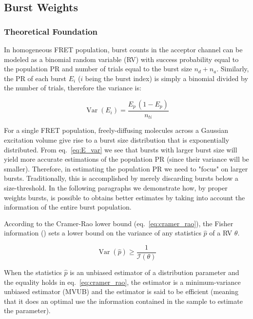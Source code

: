 \subsection{Burst Weights}
\label{sec:burstweights_theory}
\subsubsection{Theoretical Foundation}
In homogeneous FRET population, burst counts in the acceptor channel can be
modeled as a binomial random variable (RV) with success probability equal to the
population PR and number of trials equal to the burst size $n_d + n_a$.
Similarly, the PR of each burst $E_i$ ($i$ being the burst index) is 
simply a binomial divided by the number of trials, therefore the variance is:

\begin{equation}
\label{eq:E_var}
\operatorname{Var} (E_i) = \frac{E_p\,(1 - E_p)}{n_{ti}}
\end{equation}

For a single FRET population, freely-diffusing molecules across 
a Gaussian excitation volume give rise to 
a burst size distribution that is exponentially distributed.
From eq.~\ref{eq:E_var} we see that bursts with larger burst size
will yield more accurate estimations of the population PR
(since their variance will be smaller). Therefore, in estimating the 
population PR we need to "focus" on larger bursts.
Traditionally, this is accomplished by merely discarding bursts
below a size-threshold.
In the following paragraphs we demonstrate how, by proper weights
bursts, is possible to obtains better estimates by taking into 
account the information of the entire burst population.

According to the Cramer-Rao lower bound (eq.~\ref{eq:cramer_rao}), the 
Fisher information (\theta) sets a lower bound on the
variance of any statistics $\hat{p}$ of a RV $\theta$.

\begin{equation}
\label{eq:cramer_rao}
\operatorname{Var}\left(\hat{p}\right) \ge \frac{1}{\mathcal{I}(\theta)}
\end{equation}

When the statistics $\hat{p}$ is an unbiased estimator of a distribution 
parameter and the equality holds in eq.~\ref{eq:cramer_rao},
the estimator is a minimum-variance unbiased estimator (MVUB)
and the estimator is said to be efficient (meaning that it does an
optimal use the information contained in the sample to estimate the
parameter).

